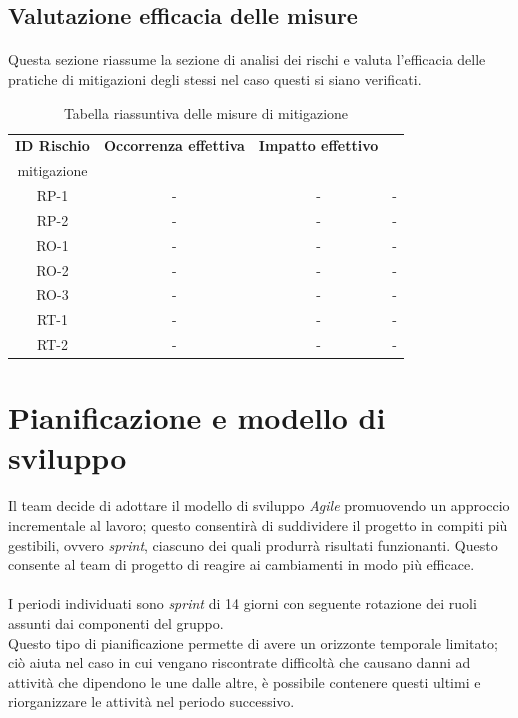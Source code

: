 \documentclass[10pt, a4paper]{article}
\begin{document}
{{{{{{\subsection{Valutazione efficacia delle misure}
\paragraph{}Questa sezione riassume la sezione di analisi dei rischi e valuta l'efficacia delle pratiche di mitigazioni degli stessi nel caso questi si siano verificati.\\
{\renewcommand{\arraystretch}{1.5}
\begin{table}[H]
\begin{tabularx}{\textwidth}{c|c|c|X}
\textbf{ID Rischio} & \textbf{Occorrenza effettiva} & \textbf{Impatto effettivo} & \textbf{\quantities{Efficacia misure di \\mitigazione}} \\
\hline
RP-1 & - & - & -\\
\hline
RP-2 & - & - & - \\
\hline
RO-1 & - & - & -\\
\hline
RO-2 & - & - & -\\
\hline
RO-3 & - & - & -\\
\hline
RT-1 & - & - & -\\
\hline
RT-2 & - & - & -\\


\end{tabularx}
\caption{Tabella riassuntiva delle misure di mitigazione}
\end{table}


\section{Pianificazione e modello di sviluppo}
\label{section:Pianificazione}

\paragraph{}Il team decide di adottare il modello di sviluppo \textit{Agile} 
promuovendo un approccio incrementale al lavoro; questo consentirà di suddividere il progetto in compiti più gestibili, ovvero \textit{sprint}, ciascuno dei quali produrrà risultati funzionanti. Questo consente al team di progetto di reagire ai cambiamenti in modo più efficace.\\
\paragraph{}I periodi individuati sono \textit{sprint} di 14 giorni con seguente rotazione dei ruoli assunti dai componenti del gruppo.\\
Questo tipo di pianificazione permette di avere un orizzonte temporale limitato; ciò aiuta nel caso in cui vengano riscontrate difficoltà che causano danni ad attività che dipendono le une dalle altre, è possibile contenere questi ultimi e riorganizzare le attività nel periodo successivo.
}}}}}}}
\end{document}
